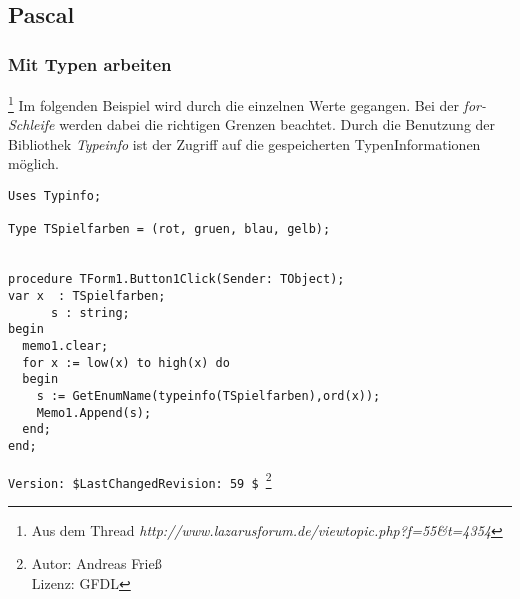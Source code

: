 \subsection{Pascal}
\subsubsection{Mit Typen arbeiten}\footnote{Aus dem Thread \textsl{http://www.lazarusforum.de/viewtopic.php?f=55\&t=4354}}
Im folgenden Beispiel wird durch die einzelnen Werte gegangen. Bei der \textit{for-Schleife} werden dabei die richtigen Grenzen beachtet. Durch die Benutzung der Bibliothek \textit{Typeinfo} ist der Zugriff auf die gespeicherten TypenInformationen möglich.
\begin{verbatim}
Uses Typinfo;

Type TSpielfarben = (rot, gruen, blau, gelb);


procedure TForm1.Button1Click(Sender: TObject);
var x  : TSpielfarben;
      s : string;
begin
  memo1.clear;
  for x := low(x) to high(x) do
  begin
    s := GetEnumName(typeinfo(TSpielfarben),ord(x));
    Memo1.Append(s);
  end;
end;

\end{verbatim}



\verb|Version: $LastChangedRevision: 59 $ |\footnote{ Autor: Andreas Frieß\\Lizenz: GFDL}